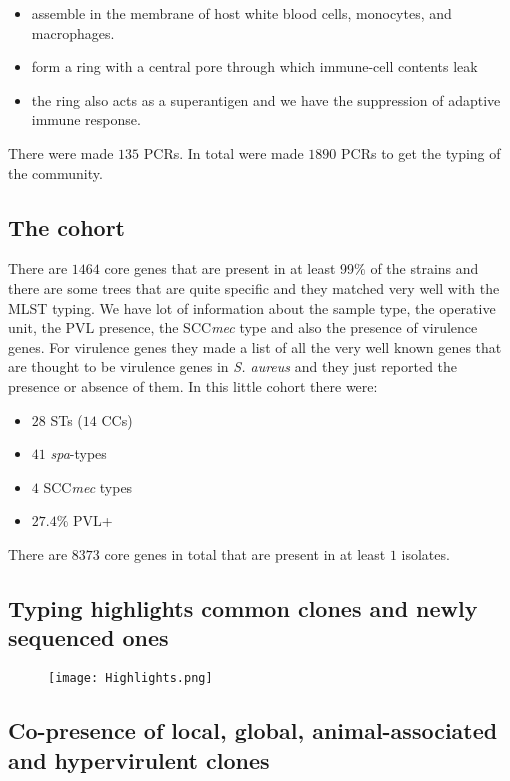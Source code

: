 \begin{itemize}
    \item assemble in the membrane of host white blood cells, monocytes, and macrophages. 
    \item form a ring with a central pore through which immune-cell contents leak
    \item the ring also acts as a superantigen and we have the suppression of adaptive immune response. 
\end{itemize}

There were made $135$ PCRs.
In total were made $1890$ PCRs to get the typing of the community. 

\subsection{The cohort}

There are $1464$ core genes that are present in at least 99$\%$ of the strains and there are some trees that are quite specific and they matched very well with the MLST typing. We have lot of information about the sample type, the operative unit, the PVL presence, the SCC\emph{mec} type and also the presence of virulence genes. For virulence genes they made a list of all the very well known genes that are thought to be virulence genes in \textit{S. aureus} and they just reported the presence or absence of them. In this little cohort there were:

\begin{itemize}
    \item $28$ STs ($14$ CCs)
    \item $41$ \emph{spa}-types
    \item $4$ SCC\emph{mec} types 
    \item $27.4\%$ PVL+
\end{itemize}

There are $8373$ core genes in total that are present in at least $1$ isolates.
  
\subsection{Typing highlights common clones and newly sequenced ones}

\begin{figure}[h]
\centering
\texttt{[image: Highlights.png]}
\caption{}
\end{figure}

\subsection{Co-presence of local, global, animal-associated and hypervirulent clones}

